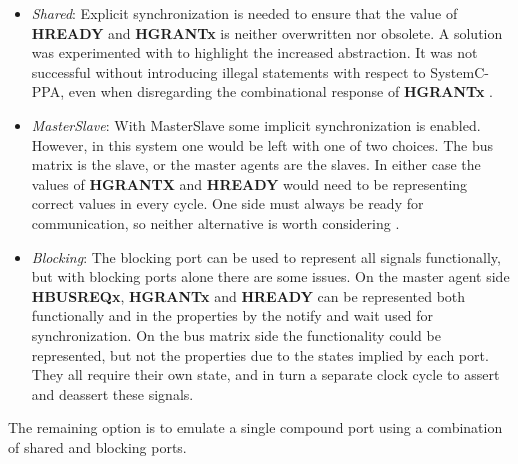 \begin{itemize}
 \item \textit{Shared}: Explicit synchronization is needed to ensure that the value of \textbf{HREADY} and \textbf{HGRANTx} is neither overwritten nor obsolete. A solution was experimented with to highlight the increased abstraction. It was not successful without introducing illegal statements with respect to SystemC-PPA, even when disregarding the combinational response of \textbf{HGRANTx} .   
 \item \textit{MasterSlave}: With MasterSlave some implicit synchronization is enabled. However, in this system one would be left with one of two choices. The bus matrix is the slave, or the master agents are the slaves. In either case the values of \textbf{HGRANTX} and \textbf{HREADY} would need to be representing correct values in every cycle. One side must always be ready for communication, so neither alternative is worth considering .  
 \item \textit{Blocking}: The blocking port can be used to represent all signals functionally, but with blocking ports alone there are some issues. On the master agent side \textbf{HBUSREQx}, \textbf{HGRANTx} and \textbf{HREADY} can be represented both functionally and in the properties by the notify and wait used for synchronization. On the bus matrix side the functionality could be represented, but not the properties due to the states implied by each port. They all require their own state, and in turn a separate clock cycle to assert and deassert these signals.
\end{itemize}

The remaining option is to emulate a single compound port using a combination of shared and blocking ports.

